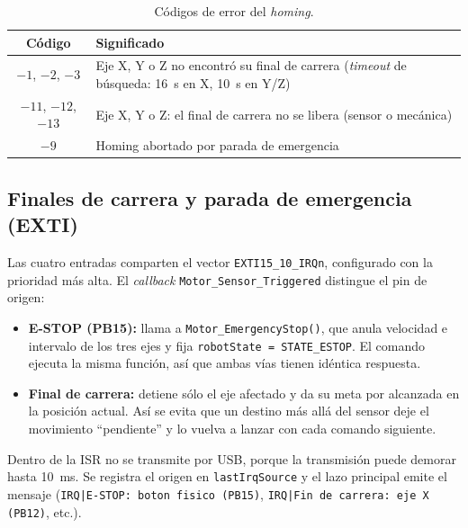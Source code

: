 \begin{table}[H]
\centering\small
\caption{Códigos de error del \emph{homing}.}\label{tab:err-homing}
\begin{tabular}{@{}cl@{}}
\toprule
\textbf{Código} & \textbf{Significado}\\
\midrule
$-1$, $-2$, $-3$ & Eje X, Y o Z no encontró su final de carrera (\emph{timeout} de búsqueda: \SI{16}{\second} en X, \SI{10}{\second} en Y/Z)\\
$-11$, $-12$, $-13$ & Eje X, Y o Z: el final de carrera no se libera (sensor o mecánica)\\
$-9$ & Homing abortado por parada de emergencia\\
\bottomrule
\end{tabular}
\end{table}

\subsection{Finales de carrera y parada de emergencia (EXTI)}
Las cuatro entradas comparten el vector \texttt{EXTI15\_10\_IRQn}, configurado con la
prioridad más alta. El \emph{callback} \texttt{Motor\_Sensor\_Triggered} distingue el pin de
origen:
\begin{itemize}
  \item \textbf{E-STOP (PB15):} llama a \texttt{Motor\_EmergencyStop()}, que anula velocidad e
        intervalo de los tres ejes y fija \texttt{robotState = STATE\_ESTOP}. El comando
         ejecuta la misma función, así que ambas vías tienen idéntica respuesta.
  \item \textbf{Final de carrera:} detiene sólo el eje afectado y da su meta por alcanzada en
        la posición actual. Así se evita que un destino más allá del sensor deje el movimiento
        ``pendiente'' y lo vuelva a lanzar con cada comando siguiente.
\end{itemize}
Dentro de la ISR no se transmite por USB, porque la transmisión puede demorar hasta
\SI{10}{\milli\second}. Se registra el origen en \texttt{lastIrqSource} y el lazo principal
emite el mensaje (\texttt{IRQ|E-STOP: boton fisico (PB15)}, \texttt{IRQ|Fin de carrera: eje X
(PB12)}, etc.).

